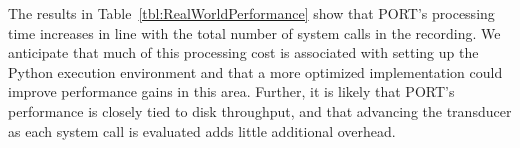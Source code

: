 %

The results in Table~\ref{tbl:RealWorldPerformance} show that
PORT's
processing time increases in line with the total number of system calls
in the recording.  We anticipate that much of this processing cost is
associated with setting up the Python execution environment and that a more
optimized implementation could improve performance gains in this area.
Further,
it is likely that PORT's performance is closely tied to
disk throughput,
and that advancing the transducer
as each system call is evaluated
adds little additional overhead.

